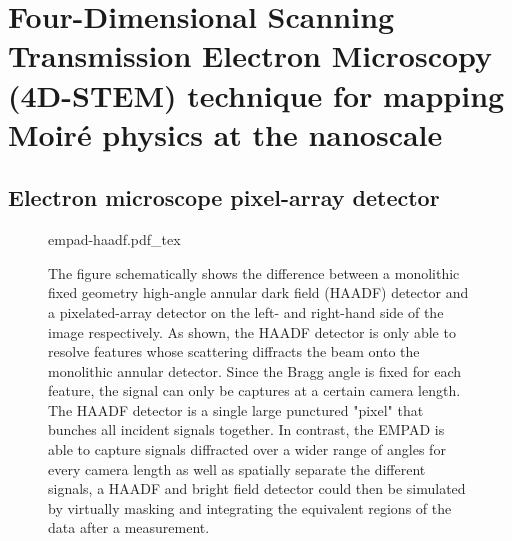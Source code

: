 \section{Four-Dimensional Scanning Transmission Electron Microscopy (4D-STEM) technique for mapping Moiré physics at the nanoscale}

\subsection{Electron microscope pixel-array detector}

\begin{figure}[h]
	\centering
	\def\svgwidth{0.65\linewidth}
	{empad-haadf.pdf_tex}
	\caption{The figure schematically shows the difference between a monolithic fixed geometry high-angle annular dark field (HAADF) detector and a pixelated-array detector on the left- and right-hand side of the image respectively. 
    As shown, the HAADF detector is only able to resolve features whose scattering diffracts the beam onto the monolithic annular detector. Since the Bragg angle is fixed for each feature, the signal can only be captures at a certain camera length. 
    The HAADF detector is a single large punctured "pixel" that bunches all incident signals together.
    In contrast, the EMPAD is able to capture signals diffracted over a wider range of angles for every camera length as well as spatially separate the different signals, a HAADF and bright field detector could then be simulated by virtually masking and integrating the equivalent regions of the data after a measurement.}
	\label{fig:empad_haadf_comparison}
\end{figure}


